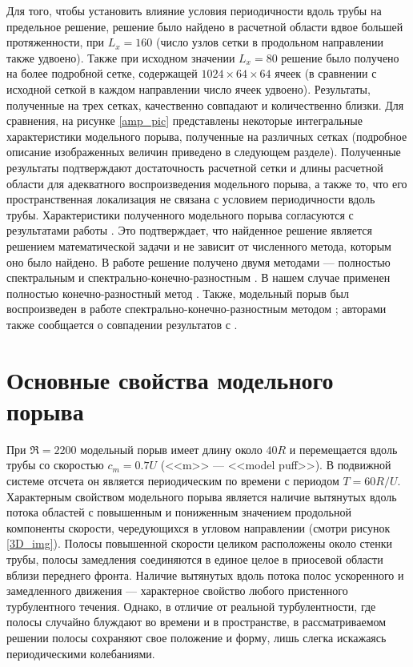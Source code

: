 Для того, чтобы установить влияние условия периодичности вдоль трубы на предельное решение, решение было найдено в расчетной области вдвое большей протяженности, при $L_x = 160$ (число узлов сетки в продольном направлении также удвоено). Также при исходном значении $L_x = 80$ решение было получено на более подробной сетке, содержащей $1024 \times 64 \times 64$ ячеек (в сравнении с исходной сеткой в каждом направлении число ячеек удвоено). Результаты, полученные на трех сетках, качественно совпадают и количественно близки. Для сравнения, на рисунке \ref{amp_pic} представлены некоторые интегральные характеристики модельного порыва, полученные на различных сетках (подробное описание изображенных величин приведено в следующем разделе). Полученные результаты подтверждают достаточность расчетной сетки и длины расчетной области для адекватного воспроизведения модельного порыва, а также то, что его пространственная локализация не связана с условием периодичности вдоль трубы. Характеристики полученного модельного порыва согласуются с результатами работы \cite{Avila2013}. Это подтверждает, что найденное решение является решением математической задачи и не зависит от численного метода, которым оно было найдено. В работе \cite{Avila2013} решение получено двумя методами --- полностью спектральным \cite{Meseguer2007} и спектрально-конечно-разностным \cite{Willis2009}. В нашем случае применен полностью конечно-разностный метод \cite{Nikitin2006}. Также, модельный порыв был воспроизведен в работе \cite{Chantry2014} спектрально-конечно-разностным методом \cite{Willis2009}; авторами также сообщается о совпадении результатов с \cite{Avila2013}. 


\section{Основные свойства модельного порыва}

При $\Re=2200$ модельный порыв имеет длину около $40R$ и перемещается вдоль трубы со скоростью $c_m = 0.7U$ (<<m>> --- <<model puff>>). В подвижной системе отсчета он является периодическим по времени с периодом $T = 60 R/U$. Характерным свойством модельного порыва является наличие вытянутых вдоль потока областей с повышенным и пониженным значением продольной компоненты скорости, чередующихся в угловом направлении (смотри рисунок \ref{3D_img}). Полосы повышенной скорости целиком расположены около стенки трубы, полосы замедления соединяются в единое целое в приосевой области вблизи переднего фронта. Наличие вытянутых вдоль потока полос ускоренного и замедленного движения --- характерное свойство любого пристенного турбулентного течения. Однако, в отличие от реальной турбулентности, где полосы случайно блуждают во времени и в пространстве, в рассматриваемом решении полосы сохраняют свое положение и форму, лишь слегка искажаясь периодическими колебаниями. 

